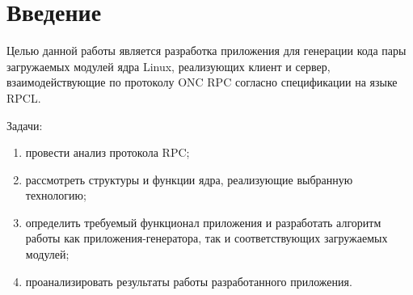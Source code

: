 \section*{Введение}

Целью данной работы является разработка приложения для генерации кода пары
загружаемых модулей ядра Linux, реализующих клиент и сервер, взаимодействующие
по протоколу ONC RPC согласно спецификации на языке RPCL.

Задачи:
\begin{enumerate}
    \item провести анализ протокола RPC;
    \item рассмотреть структуры и функции ядра, реализующие выбранную
          технологию;
    \item определить требуемый функционал приложения и разработать алгоритм
          работы как приложения-генератора, так и соответствующих загружаемых
          модулей;
    \item проанализировать результаты работы разработанного приложения.
\end{enumerate}

\pagebreak


